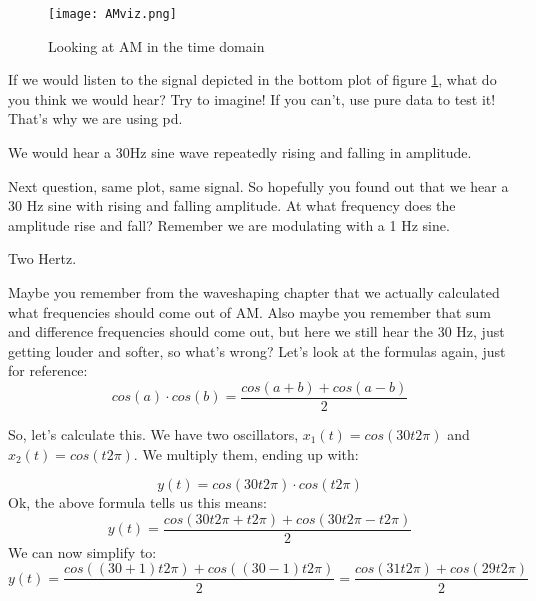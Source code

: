\begin{figure}[h!]
	\centering
	\texttt{[image: AMviz.png]}
	\caption[AM time domain]
	{Looking at AM in the time domain}
	\label{fig:AMViz}
\end{figure}


\begin{question}
	If we would listen to the signal depicted in the bottom plot of figure \ref{fig:AMViz}, what do you think we would hear? Try to imagine! If you can't, use pure data to test it! That's why we are using pd.
\end{question}
\begin{Answer}
	We would hear a 30Hz sine wave repeatedly rising and falling in amplitude.
\end{Answer}



\begin{question}
	Next question, same plot, same signal. So hopefully you found out that we hear a 30 Hz sine with rising and falling amplitude. At what frequency does the amplitude rise and fall? Remember we are modulating with a 1 Hz sine.
\end{question}
\begin{Answer}
	Two Hertz. 
\end{Answer}

Maybe you remember from the waveshaping chapter that we actually calculated what frequencies should come out of AM. Also maybe you remember that sum and difference frequencies should come out, but here we still hear the 30 Hz, just getting louder and softer, so what's wrong? Let's look at the formulas again, just for reference:
\begin{equation}
	cos(a)\cdot cos(b) = \frac{cos(a+b) + cos(a-b)}{2}
\end{equation}

So, let's calculate this. We have two oscillators, $x_1(t) = cos(30t2\pi)$ and $x_2(t)=cos(t2\pi)$. We multiply them, ending up with:

\begin{equation}
	y(t) = cos(30t2\pi) \cdot cos(t2\pi)
\end{equation}
Ok, the above formula tells us this means:
\begin{equation}
	y(t) = \frac{cos(30t2\pi+t2\pi)+cos(30t2\pi-t2\pi)}{2}
\end{equation}
We can now simplify to:
\begin{equation}
	y(t) = \frac{cos((30+1)t2\pi)+cos((30-1)t2\pi)}{2} = \frac{cos(31t2\pi)+cos(29t2\pi)}{2}
\end{equation}

